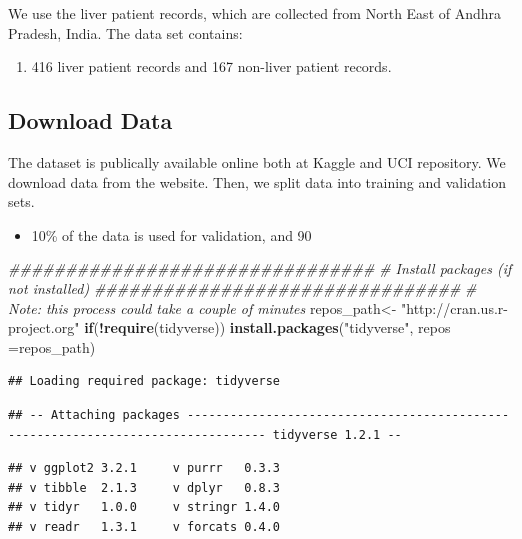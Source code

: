 \documentclass[]{article}
\newenvironment{Shaded}{\begin{snugshade}}{\end{snugshade}}
\newcommand{\CommentTok}[1]{\textcolor[rgb]{0.56,0.35,0.01}{\textit{#1}}}
\newcommand{\ControlFlowTok}[1]{\textcolor[rgb]{0.13,0.29,0.53}{\textbf{#1}}}
\newcommand{\DataTypeTok}[1]{\textcolor[rgb]{0.13,0.29,0.53}{#1}}
\newcommand{\KeywordTok}[1]{\textcolor[rgb]{0.13,0.29,0.53}{\textbf{#1}}}
\newcommand{\NormalTok}[1]{#1}
\newcommand{\OperatorTok}[1]{\textcolor[rgb]{0.81,0.36,0.00}{\textbf{#1}}}
\newcommand{\StringTok}[1]{\textcolor[rgb]{0.31,0.60,0.02}{#1}}
\begin{document}
We use the liver patient records, which are collected from North East of
Andhra Pradesh, India. The data set contains:

\begin{enumerate}
\item 416 liver patient records and 167 non-liver patient records.
\end{enumerate}

\subsection{Download Data}
\label{sec:dd}

The dataset is publically available online both at Kaggle and UCI
repository. We download data from the website. Then, we split data into
training and validation sets.

\begin{itemize}
\item 10\% of the data is used for validation, and 90%
\end{itemize}

\begin{Shaded}
\begin{Highlighting}[]
\CommentTok{################################}
\CommentTok{#  Install packages (if not installed)}
\CommentTok{################################}
\CommentTok{# Note: this process could take a couple of minutes}
\NormalTok{repos_path<-}\StringTok{ "http://cran.us.r-project.org"}
\ControlFlowTok{if}\NormalTok{(}\OperatorTok{!}\KeywordTok{require}\NormalTok{(tidyverse)) }\KeywordTok{install.packages}\NormalTok{(}\StringTok{"tidyverse"}\NormalTok{, }\DataTypeTok{repos =}\NormalTok{repos_path)}
\end{Highlighting}
\end{Shaded}

\begin{verbatim}
## Loading required package: tidyverse
\end{verbatim}

\begin{verbatim}
## -- Attaching packages --------------------------------------------------------------------------------- tidyverse 1.2.1 --
\end{verbatim}

\begin{verbatim}
## v ggplot2 3.2.1     v purrr   0.3.3
## v tibble  2.1.3     v dplyr   0.8.3
## v tidyr   1.0.0     v stringr 1.4.0
## v readr   1.3.1     v forcats 0.4.0
\end{verbatim}
\end{document}
